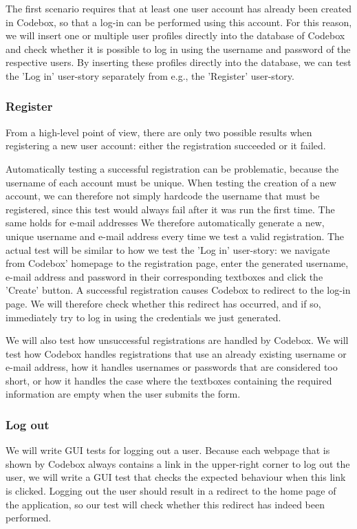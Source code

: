 \documentclass[10pt,a4paper,BCOR12mm, headexclude, footexclude,
  twoside, openright]{scrartcl}
\numberwithin{equation}{section} %
\numberwithin{figure}{section} %
\numberwithin{table}{section} %
\begin{document}
The first scenario requires that at least one user account has already been created in Codebox, so that a log-in can be performed using this account.
For this reason, we will insert one or multiple user profiles directly into the database of Codebox and check whether it is possible to log in using the username and password of the respective users.
By inserting these profiles directly into the database, we can test the 'Log in' user-story separately from e.g., the 'Register' user-story.

\subsubsection*{Register}
From a high-level point of view, there are only two possible results when registering a new user account: either the registration succeeded or it failed.

Automatically testing a successful registration can be problematic, because the username of each account must be unique.
When testing the creation of a new account, we can therefore not simply hardcode the username that must be registered, since this test would always fail after it was run the first time.
The same holds for e-mail addresses
We therefore automatically generate a new, unique username and e-mail address every time we test a valid registration.
The actual test will be similar to how we test the 'Log in' user-story: we navigate from Codebox' homepage to the registration page, enter the generated username, e-mail address and password in their corresponding textboxes and click the 'Create' button.
A successful registration causes Codebox to redirect to the log-in page. We will therefore check whether this redirect has occurred, and if so, immediately try to log in using the credentials we just generated.

We will also test how unsuccessful registrations are handled by Codebox. We will test how Codebox handles registrations that use an already existing username or e-mail address, how it handles usernames or passwords that are considered too short, or how it handles the case where the textboxes containing the required information are empty when the user submits the form.

\subsubsection*{Log out}

We will write GUI tests for logging out a user. Because each webpage that is shown by Codebox always contains a link in the upper-right corner to log out the user, we will write a GUI test that checks the expected behaviour when this link is clicked.
Logging out the user should result in a redirect to the home page of the application, so our test will check whether this redirect has indeed been performed.
\end{document}
